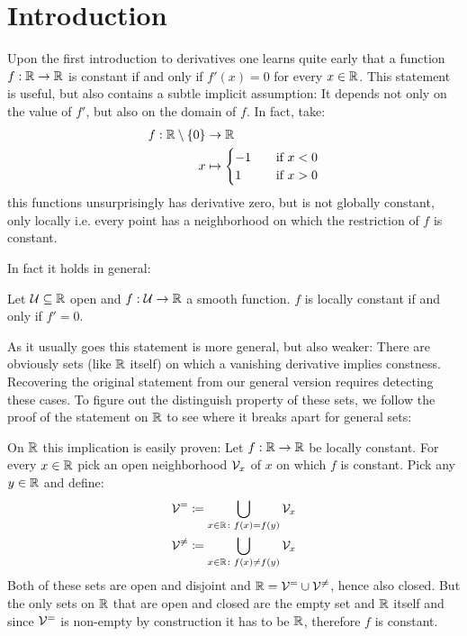 \chapter*{Introduction}
Upon the first introduction to derivatives one learns quite early that a function
$f: \mathbb{R} \to \mathbb{R}$ is constant if and only if $f'(x) = 0$ for every $x \in \mathbb{R}$. This statement is useful,
but also contains a subtle implicit assumption: It depends not only on the value of $f'$, but also on
the domain of $f$. In fact, take:
\begin{align*}
	f: \mathbb{R} \setminus \{0\} &\to \mathbb{R} \\
		x &\mapsto \begin{cases}
			-1 \quad&\text{if } x < 0 \\
			 1 \quad&\text{if } x > 0
		\end{cases}
\end{align*}
this functions unsurprisingly has derivative zero, but is not globally constant, only locally i.e. every
point has a neighborhood on which the restriction of $f$ is constant.

In fact it holds in general:
\begin{lemma}
	Let $\mathcal{U} \subseteq \mathbb{R}$ open and $f: \mathcal{U} \to \mathbb{R}$ a smooth function. $f$ is locally constant if and only if
	$f' = 0$.
\end{lemma}
As it usually goes this statement is more general, but also weaker: There are obviously sets (like $\mathbb{R}$ itself) on
which a vanishing derivative implies constness. Recovering the original statement from our general version requires
detecting these cases. To figure out the distinguish property of these sets, we follow the proof of the statement on
$\mathbb{R}$ to see where it breaks apart for general sets:

On $\mathbb{R}$ this implication is easily proven: Let $f: \mathbb{R} \to \mathbb{R}$ be locally constant. For every $x \in \mathbb{R}$
pick an open neighborhood $\mathcal{V}_x$ of $x$ on which $f$ is constant. Pick any $y \in \mathbb{R}$ and
define:
\begin{align*}
	\mathcal{V}^=      &\coloneqq \bigcup_{x \in \mathbb{R}\colon f(x) = f(y)} \mathcal{V}_x \\
	\mathcal{V}^{\neq} &\coloneqq \bigcup_{x \in \mathbb{R}\colon f(x) \neq f(y)} \mathcal{V}_x
\end{align*}
Both of these sets are open and disjoint and $\mathbb{R} = \mathcal{V}^= \cup \mathcal{V}^{\neq}$, hence also closed.
But the only sets on $\mathbb{R}$ that are open and closed are the empty set and $\mathbb{R}$ itself and since
$\mathcal{V}^=$ is non-empty by construction it has to be $\mathbb{R}$, therefore $f$ is constant.

